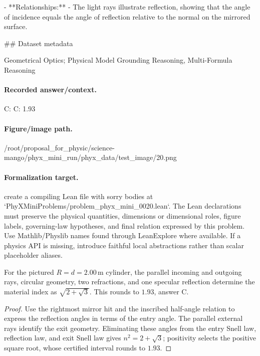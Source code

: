 - **Relationships:**
  - The light rays illustrate reflection, showing that the angle of incidence equals the angle of reflection relative to the normal on the mirrored surface.

\#\# Dataset metadata

Geometrical Optics; Physical Model Grounding Reasoning, Multi-Formula Reasoning

\paragraph{Recorded answer/context.}
C: C: 1.93

\paragraph{Figure/image path.}
/root/proposal\_for\_physic/science-mango/phyx\_mini\_run/phyx\_data/test\_image/20.png

\paragraph{Formalization target.}
create a compiling Lean file with sorry bodies at `PhyXMiniProblems/problem\_phyx\_mini\_0020.lean`. The Lean declarations must preserve the physical quantities, dimensions or dimensional roles, figure labels, governing-law hypotheses, and final relation expressed by this problem.
Use Mathlib/Physlib names found through LeanExplore where available. If a physics API is missing, introduce faithful local abstractions rather than scalar placeholder aliases.

\begin{theorem}
\label{thm:physics:phyx_mini_0020:target}
For the pictured \(R=d=2.00\,\mathrm m\) cylinder, the parallel incoming and
outgoing rays, circular geometry, two refractions, and one specular reflection
determine the material index as
\(\sqrt{2+\sqrt3}\).  This rounds to \(1.93\), answer C.
\end{theorem}
\begin{proof}
Use the rightmost mirror hit and the inscribed half-angle relation to express
the reflection angles in terms of the entry angle.  The parallel external
rays identify the exit geometry.  Eliminating these angles from the entry
Snell law, reflection law, and exit Snell law gives
\(n^2=2+\sqrt3\); positivity selects the positive square root, whose certified
interval rounds to \(1.93\).
\end{proof}

